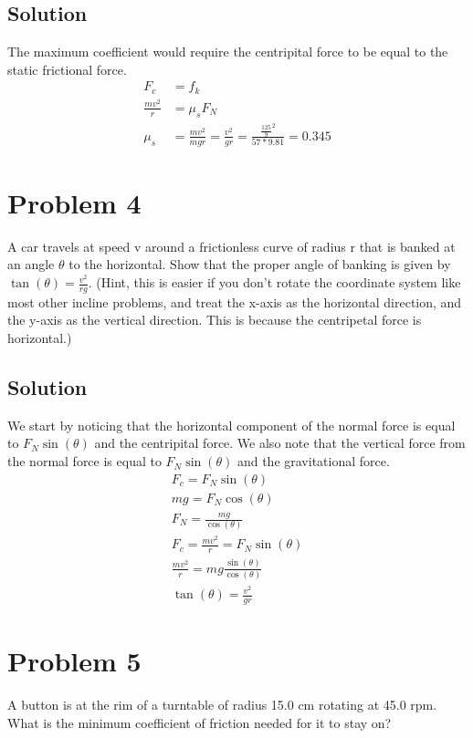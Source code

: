 \documentclass[12pt]{article}
\begin{document}
\subsection*{Solution}
The maximum coefficient would require the centripital force to be equal to the static frictional force. 
\begin{align*}
    F_c &= f_k\\
    \frac{mv^2}{r} &= \mu_s F_N\\
    \mu_s   &= \frac{mv^2}{mgr} = \frac{v^2}{gr} = \frac{\frac{125}{9}^2}{57*9.81} 
            = \boxed{0.345}
\end{align*}

\pagebreak
\section*{Problem 4}
A car travels at speed v around a frictionless curve of radius r that is banked at an angle $\theta$ to the horizontal. Show that the proper angle of banking is given by $\tan(\theta) = \frac{v^2}{rg}$. (Hint, this is easier if you don't rotate the coordinate system like most other incline problems, and treat the x-axis as the horizontal direction, and the y-axis as the vertical direction. This is because the centripetal force is horizontal.)

\subsection*{Solution}
We start by noticing that the horizontal component of the normal force is equal to $F_N\sin(\theta)$ and the centripital force. We also note that the vertical force from the normal force is equal to $F_N\sin(\theta)$ and the gravitational force.
\begin{eqnarray*}
    F_c = F_N\sin(\theta)\\
    mg = F_N\cos(\theta)\\
    F_N = \frac{mg}{\cos(\theta)}\\
    F_c = \frac{mv^2}{r} = F_N\sin(\theta)\\
    \frac{mv^2}{r} = mg\frac{\sin(\theta)}{\cos(\theta)}\\
    \boxed{\tan(\theta) = \frac{v^2}{gr}}
\end{eqnarray*}

\pagebreak
\section*{Problem 5}
A button is at the rim of a turntable of radius 15.0 cm rotating at 45.0 rpm. What is the minimum coefficient of friction needed for it to stay on?
\end{document}
